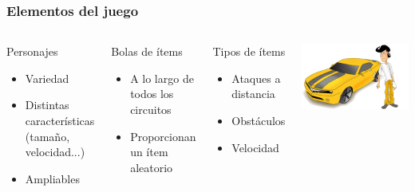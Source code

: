 \begin{frame}
\begin{columns}
    \end{columns}
    
\end{frame}

\begin{frame}
    \frametitle{Elementos del juego}

    \begin{columns}

        \column{180px}
        
        \begin{block}{Personajes}
            \begin{itemize}
                \item Variedad
                \item Distintas características (tamaño, velocidad...)
                \item Ampliables
            \end{itemize}
        \end{block}
        
        \begin{block}{Bolas de ítems}
            \begin{itemize}
                \item A lo largo de todos los circuitos
                \item Proporcionan un ítem aleatorio
            \end{itemize}
        \end{block}
        
        \begin{block}{Tipos de ítems}
            \begin{itemize}
                \item Ataques a distancia
                \item Obstáculos
                \item Velocidad
            \end{itemize}
        \end{block}

        \column{120px}

        \begin{center}
                \includegraphics[scale=0.3]{imagenes/ejemplo_personaje.png}
        \end{center}


\end{columns}
\end{frame}
